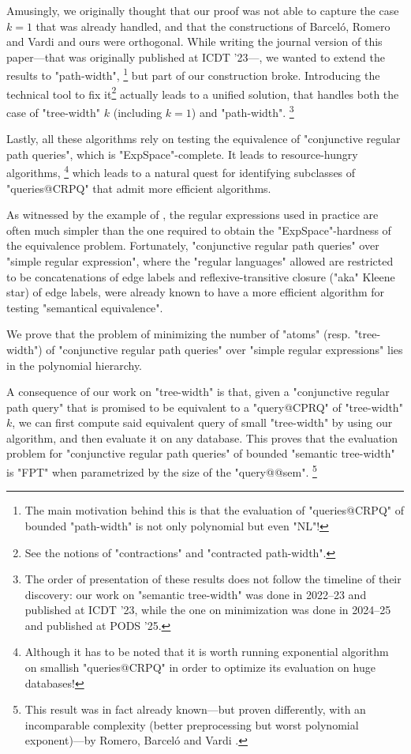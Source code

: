 Amusingly, we originally thought that our proof was not able to
capture the case $k=1$ that was already handled, and that the constructions
of Barceló, Romero and Vardi and ours were orthogonal.
While writing the journal version of this paper---that was originally
published at ICDT '23---, we wanted to extend the results to "path-width",%
\footnote{The main motivation behind this is that the evaluation of "queries@CRPQ"
of bounded "path-width" is not only polynomial but even "NL"!}
but part of our construction broke. Introducing the technical tool
to fix it\footnote{See the notions of "contractions" and "contracted path-width".}
actually leads to a unified solution, that handles both
the case of "tree-width" $k$ (including $k=1$) and "path-width".%
\footnote{The order of presentation of these results
does not follow the timeline of their discovery: our work on "semantic tree-width"
was done in 2022--23 and published at ICDT '23, while the one on minimization
was done in 2024--25 and published at PODS '25.}

Lastly, all these algorithms rely on testing the equivalence
of "conjunctive regular path queries", which is "ExpSpace"-complete.
It leads to resource-hungry algorithms,%
\footnote{Although it has to be noted that it is worth running exponential
algorithm on smallish "queries@CRPQ" in order to optimize
its evaluation on huge databases!}
which leads to a natural quest for identifying subclasses
of "queries@CRPQ" that admit more efficient algorithms.

As witnessed by the example of , the regular expressions
used in practice are often much simpler than the one required
to obtain the "ExpSpace"-hardness of the equivalence problem.
Fortunately, "conjunctive regular path queries" over "simple regular expression",
where the "regular languages" allowed are restricted to be concatenations of
edge labels and reflexive-transitive closure ("aka" Kleene star) of
edge labels, were already known to have a more efficient
algorithm for testing "semantical equivalence".

\begin{contribution}
	We prove that the problem of minimizing the number of "atoms" (resp. "tree-width")
	of "conjunctive regular path queries" over "simple regular expressions"
	lies in the polynomial hierarchy.
\end{contribution}

A consequence of our work on "tree-width" is that,
given a "conjunctive regular path query" that is promised to be equivalent
to a "query@CPRQ" of "tree-width" $k$, we can first compute said
equivalent query of small "tree-width" by using our algorithm,
and then evaluate it on any database. This proves that the evaluation
problem for "conjunctive regular path queries" of bounded "semantic tree-width"
is "FPT" when parametrized by the size of the "query@@sem".%
\footnote{This result was in fact already known---but proven differently, with
an incomparable complexity (better preprocessing but worst polynomial exponent)---by
Romero, Barceló and Vardi \cite{RomeroBarceloVardi2017Homomorphism}.}

